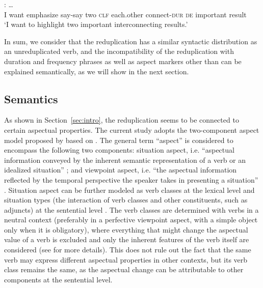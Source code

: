 \ex \gll {}          : \ldots\\
I want emphasize say-say two \textsc{clf} each.other connect-\textsc{dur} \textsc{de} important result\\
\glt `I want to highlight two important interconnecting results.'
\z\z

In sum, we consider that the reduplication has a similar syntactic distribution as an unreduplicated verb,
and the incompatibility of the reduplication with duration and frequency phrases 
as well as aspect markers other than  can be explained semantically, 
as we will show in the next section.

\subsection{Semantics}\label{sec:sem}

As shown in Section~\ref{sec:intro}, the reduplication seems to be connected to certain aspectual properties.
The current study adopts the two-component aspect model proposed by \citet{XiaoMcEnery2004} based on \citet{Smith1991}.
The general term ``aspect'' is considered to encompass the following two components:
situation aspect, i.e. ``aspectual information conveyed by the inherent semantic representation of a verb or an idealized situation'' \citep[21]{XiaoMcEnery2004};
and viewpoint aspect, i.e. ``the aspectual information reflected by the temporal perspective the speaker takes in presenting a situation'' \citep[21]{XiaoMcEnery2004}.
Situation aspect can be further modeled as verb classes  at the lexical level
and situation types (the interaction of verb classes and other constituents, such as adjuncts) at the sentential level \citep[33]{XiaoMcEnery2004}.
The verb classes are determined with verbs in a neutral context (preferably in a perfective viewpoint aspect, with a simple object only when it is obligatory),
where everything that might change the aspectual value of a verb is excluded
and only the inherent features of the verb itself are considered
(see \citealt[52]{XiaoMcEnery2004} for more details).
This does not rule out the fact that the same verb may express different aspectual properties in other contexts,
but its verb class remains the same,
as the aspectual change can be attributable to other components at the sentential level.

